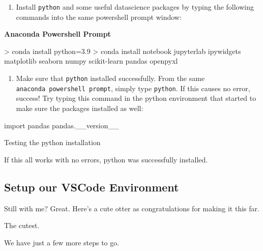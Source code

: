 \documentclass[
  letterpaper,
  DIV=11,
  numbers=noendperiod]{scrreprt}
\newenvironment{Shaded}{\begin{snugshade}}{\end{snugshade}}
\newcommand{\FunctionTok}[1]{\textcolor[rgb]{0.28,0.35,0.67}{#1}}
\newcommand{\ImportTok}[1]{\textcolor[rgb]{0.00,0.46,0.62}{#1}}
\newcommand{\NormalTok}[1]{\textcolor[rgb]{0.00,0.23,0.31}{#1}}
\newcommand{\OperatorTok}[1]{\textcolor[rgb]{0.37,0.37,0.37}{#1}}
\providecommand{\tightlist}{%
  \setlength{\itemsep}{0pt}\setlength{\parskip}{0pt}}\usepackage{longtable,booktabs,array}
\begin{document}
\begin{enumerate}
\def\labelenumi{\arabic{enumi}.}
\setcounter{enumi}{2}
\tightlist
\item
  Install \texttt{python} and some useful datascience packages by typing
  the following commands into the same powershell prompt window:
\end{enumerate}

\textbf{Anaconda Powershell Prompt}

\begin{Shaded}
\begin{Highlighting}[]
\OperatorTok{\textgreater{}}\NormalTok{ conda }\FunctionTok{install}\NormalTok{ python=3.9}
\OperatorTok{\textgreater{}}\NormalTok{ conda }\FunctionTok{install}\NormalTok{ notebook jupyterlab ipywidgets matplotlib seaborn numpy scikit{-}learn pandas openpyxl}
\end{Highlighting}
\end{Shaded}

\begin{enumerate}
\def\labelenumi{\arabic{enumi}.}
\setcounter{enumi}{3}
\tightlist
\item
  Make sure that \texttt{python} installed successfully. From the same
  \texttt{anaconda\ powershell\ prompt}, simply type \texttt{python}. If
  this causes no error, success! Try typing this command in the python
  environment that started to make sure the packages installed as well:
\end{enumerate}

\begin{Shaded}
\begin{Highlighting}[]
\ImportTok{import}\NormalTok{ pandas}
\NormalTok{pandas.\_\_version\_\_}
\end{Highlighting}
\end{Shaded}

Testing the python installation

If this all works with no errors, python was successfully installed.

\hypertarget{setup-our-vscode-environment}{%
\subsection{Setup our VSCode
Environment}\label{setup-our-vscode-environment}}

Still with me? Great. Here's a cute otter as congratulations for making
it this far.

The cutest.

We have just a few more steps to go.
\end{document}
